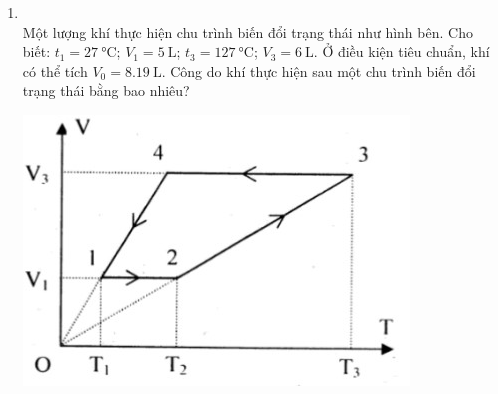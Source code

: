 \begin{enumerate}[label=\bfseries Câu \arabic*:, leftmargin=1.7cm]
\item {}\\
Một lượng khí thực hiện chu trình biến đổi trạng thái như hình bên. Cho biết: $t_1=\SI{27}{\celsius}$; $V_1=\SI{5}{\liter}$; $t_3=\SI{127}{\celsius}$; $V_3=\SI{6}{\liter}$. Ở điều kiện tiêu chuẩn, khí có thể tích $V_0=\SI{8.19}{\liter}$. Công do khí thực hiện sau một chu trình biến đổi trạng thái bằng bao nhiêu?
\begin{center}
	\includegraphics[width=0.35\linewidth]{../figs/VN12-Y24-PH-SYL-015P-4}
\end{center}

\end{enumerate}






